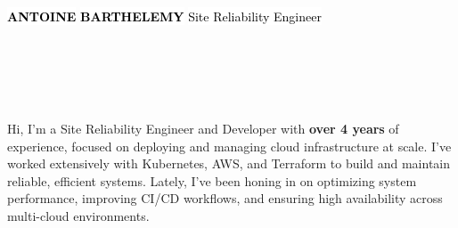 \documentclass[10pt]{developercv}
\begin{document}
\hspace{-7pt}
\begin{minipage}[t]{0.50\textwidth}
	\vspace{-\baselineskip}
	\vspace{7pt}
	\colorbox{white}{{\HUGE\textcolor{black}{\textbf{\MakeUppercase{Antoine}}}}}
	\colorbox{white}{{\HUGE\textcolor{black}{\textbf{\MakeUppercase{Barthelemy}}}}}
	\colorbox{white}{\textcolor{black}{\huge{Site Reliability Engineer}}}
	\vspace{6pt}
\end{minipage}
\begin{minipage}[t]{0.28\textwidth}
	\vspace{-\baselineskip}
	\vspace{9pt}
	\\
	\\
	\\
	\\
\end{minipage}
\begin{minipage}[t]{0.275\textwidth}
	\vspace{-\baselineskip}
	\hspace{0.1cm}
\end{minipage}

\vspace{-10pt}


\hspace{0pt}\begin{minipage}[t]{1.00\textwidth}
	\vspace{-\baselineskip}
	{Hi, I’m a Site Reliability Engineer and Developer with \textbf{over 4 years} of experience, focused on deploying and managing cloud infrastructure at scale. I’ve worked extensively with Kubernetes, AWS, and Terraform to build and maintain reliable, efficient systems. Lately, I’ve been honing in on optimizing system performance, improving CI/CD workflows, and ensuring high availability across multi-cloud environments.}
\end{minipage}
\hfill

\end{document}
